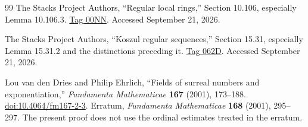 \documentclass[11pt,letterpaper]{article}
\theoremstyle{definition}
\theoremstyle{remark}
\numberwithin{equation}{section}
\begin{document}
\begin{thebibliography}{99}
The Stacks Project Authors,
``Regular local rings,'' Section 10.106, especially Lemma 10.106.3.
\href{https://stacks.math.columbia.edu/tag/00NN}{Tag 00NN}.
Accessed September 21, 2026.

The Stacks Project Authors,
``Koszul regular sequences,'' Section 15.31, especially Lemma 15.31.2 and the distinctions preceding it.
\href{https://stacks.math.columbia.edu/tag/062D}{Tag 062D}.
Accessed September 21, 2026.

Lou van den Dries and Philip Ehrlich,
``Fields of surreal numbers and exponentiation,''
\emph{Fundamenta Mathematicae} \textbf{167} (2001), 173--188.
\href{https://doi.org/10.4064/fm167-2-3}{doi:10.4064/fm167-2-3}.
Erratum, \emph{Fundamenta Mathematicae} \textbf{168} (2001), 295--297.
The present proof does not use the ordinal estimates treated in the erratum.

\end{thebibliography}
\end{document}
